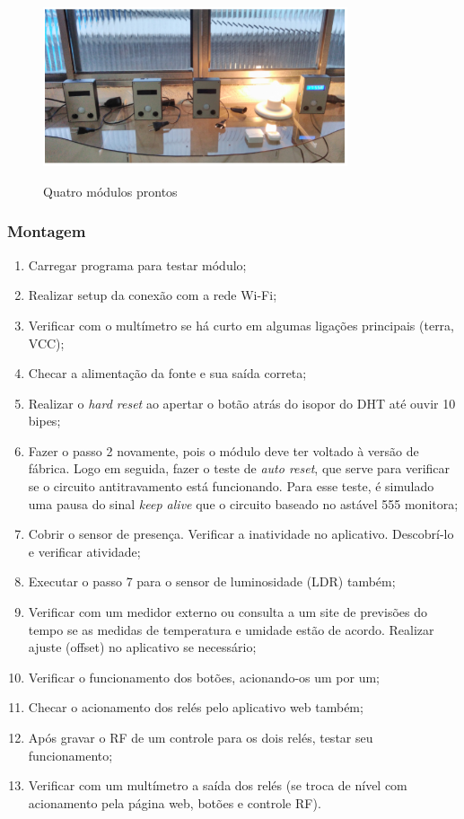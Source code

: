 \begin{enumerate}
	\begin{figure}[H]
		\centering
		\caption{Quatro módulos prontos}
		\includegraphics[width=0.8\textwidth]{QuatroModulos}
		\label{fig:QuatroModulos}
	\end{figure}

\end{enumerate}

\subsubsection {Montagem}
\begin{enumerate}
	\item Carregar programa para testar módulo;
	\item Realizar setup da conexão com a rede Wi-Fi;
	\item Verificar com o multímetro se há curto em algumas ligações principais (terra, VCC);
	\item Checar a alimentação da fonte e sua saída correta;
	\item Realizar o \emph{hard reset} ao apertar o botão atrás do isopor do DHT até ouvir 10 bipes;
	\item Fazer o passo 2 novamente, pois o módulo deve ter voltado à versão de fábrica. Logo em seguida, fazer o teste de \emph{auto reset}, que serve para verificar se o circuito antitravamento está funcionando. Para esse teste, é simulado uma pausa do sinal \emph{keep alive} que o circuito baseado no astável 555 monitora;
	\item Cobrir o sensor de presença. Verificar a inatividade no aplicativo. Descobrí-lo e verificar atividade;
	\item Executar o passo 7 para o sensor de luminosidade (LDR) também;
	\item Verificar com um medidor externo ou consulta a um site de previsões do tempo se as medidas de temperatura e umidade estão de acordo. Realizar ajuste (offset) no aplicativo se necessário;
	\item Verificar o funcionamento dos botões, acionando-os um por um;
	\item Checar o acionamento dos relés pelo aplicativo web também;
	\item Após gravar o RF de um controle para os dois relés, testar seu funcionamento;
	\item Verificar com um multímetro a saída dos relés (se troca de nível com acionamento pela página web, botões e controle RF).
\end{enumerate}
